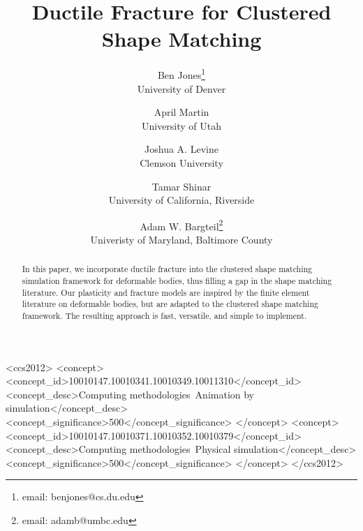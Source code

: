 \documentclass[conference]{acmsiggraph}
\title{Ductile Fracture for Clustered Shape Matching}
\author{Ben Jones\thanks{email: benjones@cs.du.edu}\\University of Denver \and April Martin\\University of Utah
\and Joshua A. Levine\\Clemson University
\and Tamar Shinar\\University of California, Riverside\vspace{0.1in}
\and Adam W. Bargteil\thanks{email: adamb@umbc.edu}\\Univeristy of Maryland, Baltimore County}
\begin{document}




\maketitle

\begin{abstract}
In this paper, we incorporate ductile fracture into the clustered shape matching simulation framework
for deformable bodies, thus filling a gap in the shape matching literature.  
Our plasticity and fracture models are inspired by the finite element literature on deformable bodies, 
but are adapted to the clustered shape matching framework.
The resulting approach is fast, versatile, and simple to implement.
\end{abstract}

\begin{CCSXML}
<ccs2012>
<concept>
<concept_id>10010147.10010341.10010349.10011310</concept_id>
<concept_desc>Computing methodologies~Animation by simulation</concept_desc>
<concept_significance>500</concept_significance>
</concept>
<concept>
<concept_id>10010147.10010371.10010352.10010379</concept_id>
<concept_desc>Computing methodologies~Physical simulation</concept_desc>
<concept_significance>500</concept_significance>
</concept>
</ccs2012>
\end{CCSXML}

\end{document}

